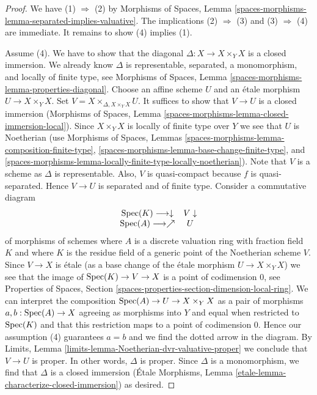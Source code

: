 \begin{proof}
We have (1) $\Rightarrow$ (2) by
Morphisms of Spaces, Lemma
\ref{spaces-morphisms-lemma-separated-implies-valuative}.
The implications (2) $\Rightarrow$ (3) and (3) $\Rightarrow$ (4)
are immediate. It remains to show (4) implies (1).

\medskip\noindent
Assume (4). We have to show that the diagonal
$\Delta : X \to X \times_Y X$ is a closed
immersion. We already know $\Delta$ is representable, separated,
a monomorphism, and locally of finite type, see Morphisms of Spaces, Lemma
\ref{spaces-morphisms-lemma-properties-diagonal}.
Choose an affine scheme $U$ and an \'etale morphism
$U \to X \times_Y X$. Set $V = X \times_{\Delta, X \times_Y X} U$.
It suffices to show that $V \to U$ is a closed immersion
(Morphisms of Spaces, Lemma
\ref{spaces-morphisms-lemma-closed-immersion-local}).
Since $X \times_Y X$ is locally of finite type over $Y$ we see that
$U$ is Noetherian (use Morphisms of Spaces, Lemmas
\ref{spaces-morphisms-lemma-composition-finite-type},
\ref{spaces-morphisms-lemma-base-change-finite-type}, and
\ref{spaces-morphisms-lemma-locally-finite-type-locally-noetherian}).
Note that $V$ is a scheme as $\Delta$ is representable.
Also, $V$ is quasi-compact because $f$ is quasi-separated.
Hence $V \to U$ is separated and of finite type. Consider a commutative diagram
$$
\begin{array}{cc}\operatorname{Spec}(K) \longrightarrow\downarrow & V \downarrow \\ \operatorname{Spec}(A) \longrightarrow\nearrow & U\end{array}
$$
of morphisms of schemes where $A$ is a discrete valuation ring
with fraction field $K$ and where $K$ is the residue field of
a generic point of the Noetherian scheme $V$. Since $V \to X$
is \'etale (as a base change of the \'etale morphism $U \to X \times_Y X$)
we see that the image of $\operatorname{Spec}(K) \to V \to X$ is a point of
codimension $0$, see Properties of Spaces, Section
\ref{spaces-properties-section-dimension-local-ring}.
We can interpret the composition $\operatorname{Spec}(A) \to U \to X \times_Y X$
as a pair of morphisms $a, b : \operatorname{Spec}(A) \to X$ agreeing as morphisms
into $Y$ and equal when restricted to $\operatorname{Spec}(K)$ and that this
restriction maps to a point of codimension $0$. Hence our assumption
(4) guarantees $a = b$ and we find the dotted arrow in the diagram.
By Limits, Lemma \ref{limits-lemma-Noetherian-dvr-valuative-proper}
we conclude that $V \to U$ is proper. In other words, $\Delta$ is proper.
Since $\Delta$ is a monomorphism, we find that $\Delta$ is a
closed immersion (\'Etale Morphisms, Lemma
\ref{etale-lemma-characterize-closed-immersion}) as desired.
\end{proof}


